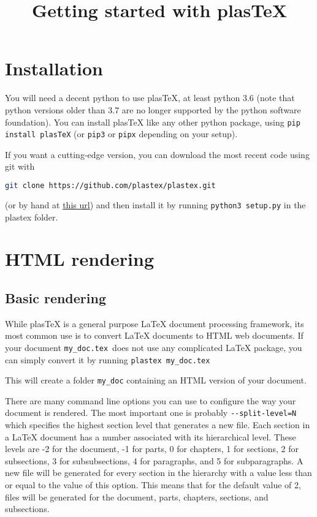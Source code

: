 \documentclass{article}
\title{Getting started with plasTeX}
\newcommand{\sh}[1]{\lstinline[language=Bash]!#1!}
\begin{document}
\maketitle

\section{Installation}

You will need a decent python to use plasTeX, at least python 3.6 (note that
python versions older than 3.7 are no longer supported by the python software
foundation).
You can install plasTeX like any other python package, using
\sh{pip install plasTeX}
(or \sh{pip3} or \sh{pipx} depending on your setup).


If you want a cutting-edge version, you can download the most recent code using
git with
\begin{lstlisting}[language=Bash]
git clone https://github.com/plastex/plastex.git
\end{lstlisting}
(or by hand at \href{https://github.com/plastex/plastex/zipball/master}{this url})
and then install it by running
\sh{python3 setup.py} in the plastex folder.

\section{HTML rendering}

\subsection{Basic rendering}

While plasTeX is a general purpose LaTeX document processing framework, its
most common use is to convert LaTeX documents to HTML web documents.
If your document \verb+my_doc.tex+ does not use any complicated LaTeX package,
you can simply convert it by running
\verb+plastex my_doc.tex+

This will create a folder \verb+my_doc+ containing an HTML version of your document.

There are many command line options you can use to configure the way your document is rendered.
The most important one is probably \sh{--split-level=N} which specifies
the highest section level that generates a new file. Each section in a LaTeX
document has a number associated with its hierarchical level. These levels are
-2 for the document, -1 for parts, 0 for chapters, 1 for sections, 2 for
subsections, 3 for subsubsections, 4 for paragraphs, and 5 for subparagraphs. A
new file will be generated for every section in the hierarchy with a value less
than or equal to the value of this option. This means that for the default
value of 2, files will be generated for the document, parts, chapters,
sections, and subsections.
\end{document}
